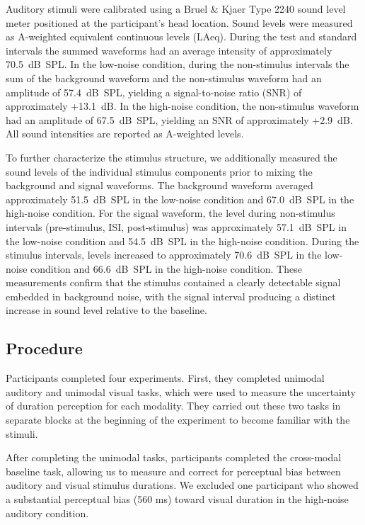 \documentclass{jov}
\begin{document}
Auditory stimuli were calibrated using a Bruel \& Kjaer Type 2240 sound level meter positioned at the participant's head location. Sound levels were measured as A-weighted equivalent continuous levels (LAeq). During the test and standard intervals the summed waveforms had an average intensity of approximately 70.5~dB~SPL. In the low-noise condition, during the non-stimulus intervals the sum of the background waveform and the non-stimulus waveform had an amplitude of 57.4~dB~SPL, yielding a signal-to-noise ratio (SNR) of approximately +13.1~dB. In the high-noise condition, the non-stimulus waveform had an amplitude of 67.5~dB~SPL, yielding an SNR of approximately +2.9~dB. All sound intensities are reported as A-weighted levels.

To further characterize the stimulus structure, we additionally measured the sound levels of the individual stimulus components prior to mixing the background and signal waveforms. The background waveform averaged approximately 51.5~dB~SPL in the low-noise condition and 67.0~dB~SPL in the high-noise condition. For the signal waveform, the level during non-stimulus intervals (pre-stimulus, ISI, post-stimulus) was approximately 57.1~dB~SPL in the low-noise condition and 54.5~dB~SPL in the high-noise condition. During the stimulus intervals, levels increased to approximately 70.6~dB~SPL in the low-noise condition and 66.6~dB~SPL in the high-noise condition. These measurements confirm that the stimulus contained a clearly detectable signal embedded in background noise, with the signal interval producing a distinct increase in sound level relative to the baseline.

\subsection{Procedure}
Participants completed four experiments. First, they completed unimodal auditory and unimodal visual tasks, which were used to measure the uncertainty of duration perception for each modality. They carried out these two tasks in separate blocks at the beginning of the experiment to become familiar with the stimuli. 

After completing the unimodal tasks, participants completed the cross-modal baseline task, allowing us to measure and correct for perceptual bias between auditory and visual stimulus durations. We excluded one participant who showed a substantial perceptual bias (560 ms) toward visual duration in the high-noise auditory condition. 
\end{document}
